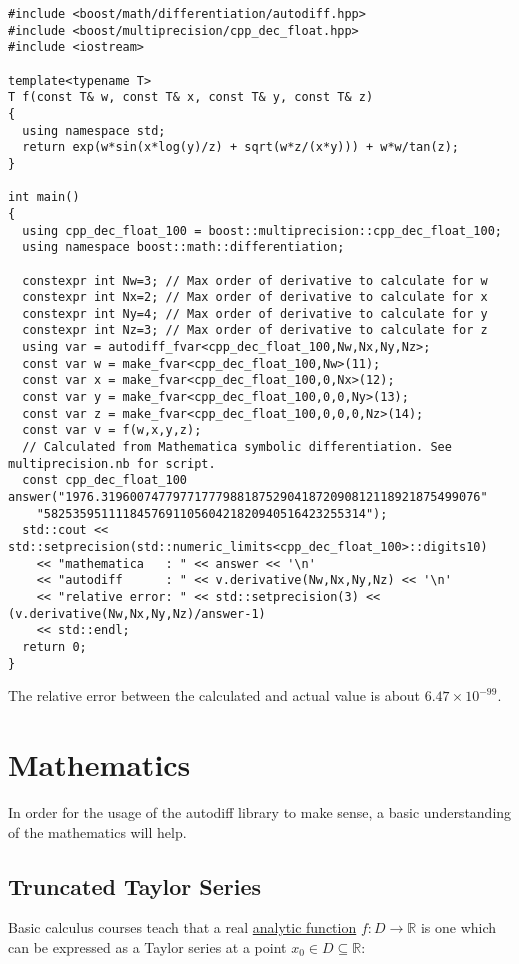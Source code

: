 \documentclass{article}
\begin{document}
\begin{verbatim}
#include <boost/math/differentiation/autodiff.hpp>
#include <boost/multiprecision/cpp_dec_float.hpp>
#include <iostream>

template<typename T>
T f(const T& w, const T& x, const T& y, const T& z)
{
  using namespace std;
  return exp(w*sin(x*log(y)/z) + sqrt(w*z/(x*y))) + w*w/tan(z);
}

int main()
{
  using cpp_dec_float_100 = boost::multiprecision::cpp_dec_float_100;
  using namespace boost::math::differentiation;

  constexpr int Nw=3; // Max order of derivative to calculate for w
  constexpr int Nx=2; // Max order of derivative to calculate for x
  constexpr int Ny=4; // Max order of derivative to calculate for y
  constexpr int Nz=3; // Max order of derivative to calculate for z
  using var = autodiff_fvar<cpp_dec_float_100,Nw,Nx,Ny,Nz>;
  const var w = make_fvar<cpp_dec_float_100,Nw>(11);
  const var x = make_fvar<cpp_dec_float_100,0,Nx>(12);
  const var y = make_fvar<cpp_dec_float_100,0,0,Ny>(13);
  const var z = make_fvar<cpp_dec_float_100,0,0,0,Nz>(14);
  const var v = f(w,x,y,z);
  // Calculated from Mathematica symbolic differentiation. See multiprecision.nb for script.
  const cpp_dec_float_100 answer("1976.31960074779771777988187529041872090812118921875499076"
    "582535951111845769110560421820940516423255314");
  std::cout << std::setprecision(std::numeric_limits<cpp_dec_float_100>::digits10)
    << "mathematica   : " << answer << '\n'
    << "autodiff      : " << v.derivative(Nw,Nx,Ny,Nz) << '\n'
    << "relative error: " << std::setprecision(3) << (v.derivative(Nw,Nx,Ny,Nz)/answer-1)
    << std::endl;
  return 0;
}
\end{verbatim}
The relative error between the calculated and actual value is about $6.47\times10^{-99}$.

\section{Mathematics}

In order for the usage of the autodiff library to make sense, a basic understanding of the mathematics will help.

\subsection{Truncated Taylor Series}

Basic calculus courses teach that a real \href{https://en.wikipedia.org/wiki/Analytic_function}{analytic function}
$f : D\rightarrow\mathbb{R}$ is one which can be expressed as a Taylor series at a point
$x_0\in D\subseteq\mathbb{R}$:
\end{document}
